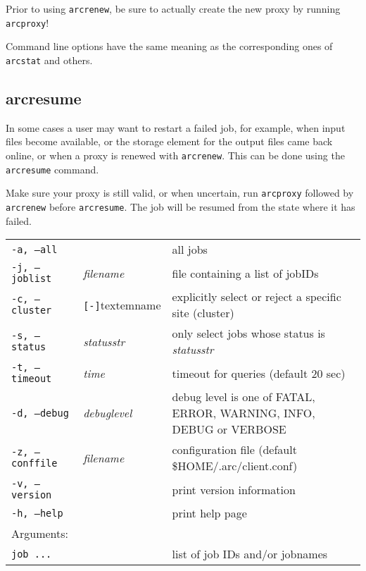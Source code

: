 \begin{framed}
 Prior to using \texttt{arcrenew}, be sure to actually create the
new proxy by running \verb#arcproxy#!
\end{framed}

Command line options have the same meaning as the corresponding ones of \verb#arcstat# and others.


\subsection{arcresume}
\label{sec:arcresume}

In some cases a user may want to restart a failed job, for example, when input
files become available, or the storage element for the output files came back
online, or when a proxy is renewed with \texttt{arcrenew}. This can be done using
the \texttt{arcresume} command.

\begin{framed}
Make sure your proxy is still valid, or when uncertain, run \verb#arcproxy# followed by 
\verb#arcrenew# before \verb#arcresume#. The job will be resumed from the state where it has failed.
\end{framed}

\hspace*{0.5cm}
\begin{shaded}
\end{shaded}
\begin{longtable}{llp{8cm}}
   \texttt{-a, --all}& & all jobs\\
   \texttt{-j, --joblist}& \textit{filename} & file containing a list of jobIDs\\
   \texttt{-c, --cluster}&\verb#[-]#textem{name}&explicitly select or reject a specific site (cluster)\\
   \texttt{-s, --status}& \textit{statusstr} &only select jobs whose status is \textit{statusstr}\\
   \texttt{-t, --timeout}& \textit{time} & timeout for queries (default 20 sec)\\
   \texttt{-d, --debug}& \textit{debuglevel}&debug level is one of  FATAL, ERROR, WARNING, INFO, DEBUG or VERBOSE\\
   \texttt{-z, --conffile}&\textit{filename}& configuration file (default {\$}HOME/.arc/client.conf)\\
   \texttt{-v, --version}& & print version information\\
   \texttt{-h, --help}& & print help page\\
   Arguments:&&\\
   \texttt{job ...} && list of job IDs and/or jobnames\\
\end{longtable}

